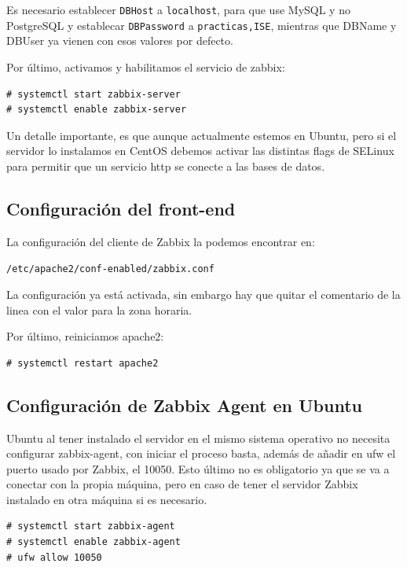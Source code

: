 \documentclass[12pt, spanish]{article}
\begin{document}
Es necesario establecer \texttt{DBHost} a \texttt{localhost}, para que use MySQL y no PostgreSQL y establecar \texttt{DBPassword} a \texttt{practicas,ISE}, mientras que DBName y DBUser ya vienen con esos valores por defecto.


Por último, activamos y habilitamos el servicio de zabbix:
\begin{verbatim}
# systemctl start zabbix-server
# systemctl enable zabbix-server
\end{verbatim}

Un detalle importante, es que aunque actualmente estemos en Ubuntu, pero si el servidor lo instalamos en CentOS debemos activar las distintas flags de SELinux para permitir que un servicio http se conecte a las bases de datos.



\subsection{Configuración del front-end}

La configuración del cliente de Zabbix la podemos encontrar en:

\texttt{/etc/apache2/conf-enabled/zabbix.conf}

La configuración ya está activada, sin embargo hay que quitar el comentario de la linea con el valor para la zona horaria.


Por último, reiniciamos apache2:
\begin{verbatim}
# systemctl restart apache2
\end{verbatim}

\subsection{Configuración de Zabbix Agent en Ubuntu}

Ubuntu al tener instalado el servidor en el mismo sistema operativo no necesita configurar zabbix-agent, con iniciar el proceso basta, además de añadir en ufw el puerto usado por Zabbix, el 10050. Esto último no es obligatorio ya que se va a conectar con la propia máquina, pero en caso de tener el servidor Zabbix instalado en otra máquina si es necesario.
\begin{verbatim}
# systemctl start zabbix-agent
# systemctl enable zabbix-agent
# ufw allow 10050
\end{verbatim}
\end{document}
